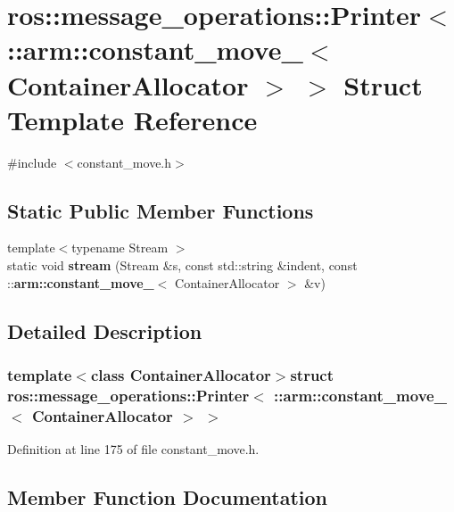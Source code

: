 \section{ros\-:\-:message\-\_\-operations\-:\-:\-Printer$<$ \-:\-:arm\-:\-:constant\-\_\-move\-\_\-$<$ \-Container\-Allocator $>$ $>$ \-Struct \-Template \-Reference}
\label{structros_1_1message__operations_1_1Printer_3_01_1_1arm_1_1constant__move___3_01ContainerAllocator_01_4_01_4}


{\ttfamily \#include $<$constant\-\_\-move.\-h$>$}

\subsection*{\-Static \-Public \-Member \-Functions}
\begin{DoxyCompactItemize}
\item 
{\footnotesize template$<$typename Stream $>$ }\\static void {\bf stream} (\-Stream \&s, const std\-::string \&indent, const \-::{\bf arm\-::constant\-\_\-move\-\_\-}$<$ \-Container\-Allocator $>$ \&v)
\end{DoxyCompactItemize}


\subsection{\-Detailed \-Description}
\subsubsection*{template$<$class Container\-Allocator$>$struct ros\-::message\-\_\-operations\-::\-Printer$<$ \-::arm\-::constant\-\_\-move\-\_\-$<$ Container\-Allocator $>$ $>$}



\-Definition at line 175 of file constant\-\_\-move.\-h.



\subsection{\-Member \-Function \-Documentation}

